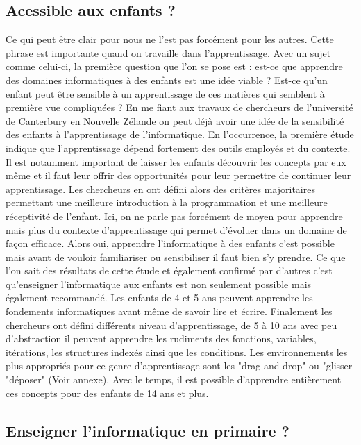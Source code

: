 \subsection{Acessible aux enfants ?}
Ce qui peut être clair pour nous ne l'est pas forcément pour les autres. Cette phrase est importante quand on travaille dans l'apprentissage. Avec un sujet comme celui-ci, la première question que l'on se pose est : est-ce que apprendre des domaines informatiques à des enfants est une idée viable ? Est-ce qu'un enfant peut être sensible à un apprentissage de ces matières qui semblent à première vue compliquées ? En me fiant aux travaux de chercheurs de l'université de Canterbury en Nouvelle Zélande \cite{1} on peut déjà avoir une idée de la sensibilité des enfants à l'apprentissage de l'informatique. En l'occurrence, la première étude indique que l'apprentissage dépend fortement des outils employés et du contexte. Il est notamment important de laisser les enfants découvrir les concepts par eux même et il faut leur offrir des opportunités pour leur permettre de continuer leur apprentissage. Les chercheurs en ont défini alors des critères majoritaires permettant une meilleure introduction à la programmation et une meilleure réceptivité de l'enfant. Ici, on ne parle pas forcément de moyen pour apprendre mais plus du contexte d'apprentissage qui permet d'évoluer dans un domaine de façon efficace. Alors oui, apprendre l'informatique à des enfants c'est possible mais avant de vouloir familiariser ou sensibiliser il faut bien s'y prendre. Ce que l'on sait des résultats de cette étude et également confirmé par d'autres \cite{8} c'est qu'enseigner l'informatique aux enfants est non seulement possible mais également recommandé. Les enfants de 4 et 5 ans peuvent apprendre les fondements informatiques avant même de savoir lire et écrire. Finalement les chercheurs ont défini différents niveau d'apprentissage, de 5 à 10 ans avec peu d'abstraction il peuvent apprendre les rudiments des fonctions, variables, itérations, les structures indexés ainsi que les conditions.
Les environnements les plus appropriés pour ce genre d'apprentissage sont les "drag and drop" ou "glisser-"déposer" (Voir annexe). Avec le temps, il est possible d'apprendre entièrement ces concepts pour des enfants de 14 ans et plus.

\newpage

\subsection{Enseigner l'informatique en primaire ?}

